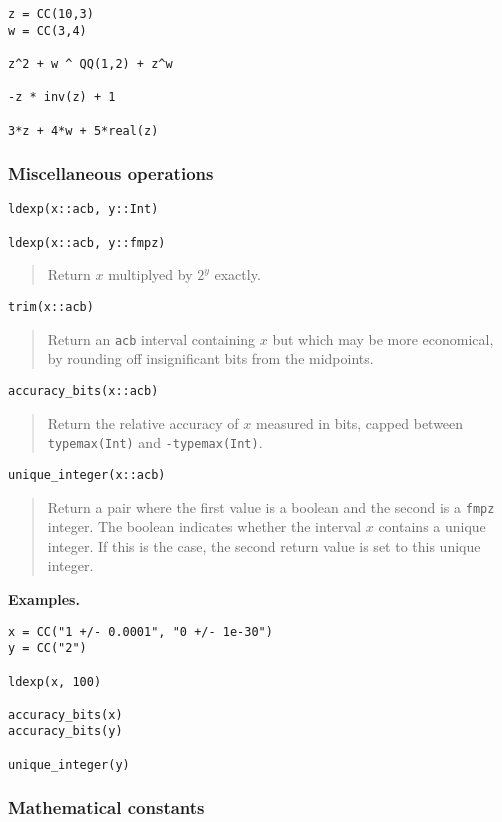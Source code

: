 \documentclass[a4paper,10pt]{article}
\newcommand{\code}{\lstinline}
\newcommand{\desc}[1]{\vspace{-3mm}\begin{quote}#1\end{quote}}
\begin{document}
{{\begin{lstlisting}
z = CC(10,3)
w = CC(3,4)

z^2 + w ^ QQ(1,2) + z^w

-z * inv(z) + 1

3*z + 4*w + 5*real(z)
\end{lstlisting}

\subsubsection{Miscellaneous operations}

\begin{lstlisting}
ldexp(x::acb, y::Int)

ldexp(x::acb, y::fmpz)
\end{lstlisting}

\desc{Return $x$ multiplyed by $2^y$ exactly.}

\begin{lstlisting}
trim(x::acb)
\end{lstlisting}

\desc{Return an \code{acb} interval containing $x$ but which may be more economical,
by rounding off insignificant bits from the midpoints.}

\begin{lstlisting}
accuracy_bits(x::acb)
\end{lstlisting}

\desc{Return the relative accuracy of $x$ measured in bits, capped
between \code{typemax(Int)} and \code{-typemax(Int)}.}

\begin{lstlisting}
unique_integer(x::acb)
\end{lstlisting}

\desc{Return a pair where the first value is a boolean and the second
is a \code{fmpz} integer. The boolean indicates whether the interval $x$
contains a unique integer. If this is the case, the second return
value is set to this unique integer.}

\textbf{Examples.}

\begin{lstlisting}
x = CC("1 +/- 0.0001", "0 +/- 1e-30")
y = CC("2")

ldexp(x, 100)

accuracy_bits(x)
accuracy_bits(y)

unique_integer(y)
\end{lstlisting}

\subsubsection{Mathematical constants}

}}
\end{document}
